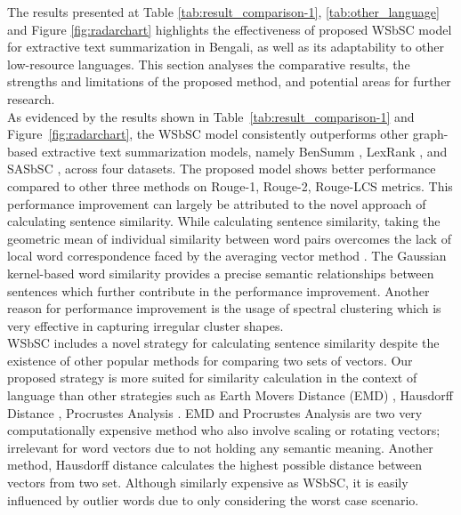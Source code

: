 The results presented at Table \ref{tab:result_comparison-1}, \ref{tab:other_language} and Figure \ref{fig:radarchart} highlights the effectiveness of proposed WSbSC model for extractive text summarization in Bengali, as well as its adaptability to other low-resource languages. This section analyses the comparative results, the strengths and limitations of the proposed method, and potential areas for further research.\\

As evidenced by the results shown in Table~\ref{tab:result_comparison-1} and Figure~\ref{fig:radarchart}, the WSbSC model consistently outperforms other graph-based extractive text summarization models, namely BenSumm \cite{das-2022-tfidf}, LexRank \cite{Erkan-lexRank-2004}, and SASbSC \cite{roychowdhury-etal-2022-spectral-base}, across four datasets. The proposed model shows better performance compared to other three methods on Rouge-1, Rouge-2, Rouge-LCS metrics. This performance improvement can largely be attributed to the novel approach of calculating sentence similarity. While calculating sentence similarity, taking the geometric mean of individual similarity between word pairs overcomes the lack of local word correspondence faced by the averaging vector method \cite{roychowdhury-etal-2022-spectral-base}. The Gaussian kernel-based word similarity provides a precise semantic relationships between sentences which further contribute in the performance improvement. Another reason for performance improvement is the usage of spectral clustering which is very effective in capturing irregular cluster shapes.\\

WSbSC includes a novel strategy for calculating sentence similarity despite the existence of other popular methods for comparing two sets of vectors. Our proposed strategy is more suited for similarity calculation in the context of language than other strategies such as Earth Movers Distance (EMD) \cite{Rubner-19998-emd}, Hausdorff Distance \cite{hausdorff-1914-hausdorff-distance}, Procrustes Analysis \cite{Gower-1975-procrustes-distance}. EMD \cite{Rubner-19998-emd} and Procrustes Analysis \cite{Gower-1975-procrustes-distance} are two very computationally expensive method who also involve scaling or rotating vectors; irrelevant for word vectors due to not holding any semantic meaning. Another method, Hausdorff distance \cite{hausdorff-1914-hausdorff-distance} calculates the highest possible distance between vectors from two set. Although similarly expensive as WSbSC, it is easily influenced by outlier words due to only considering the worst case scenario.\\

